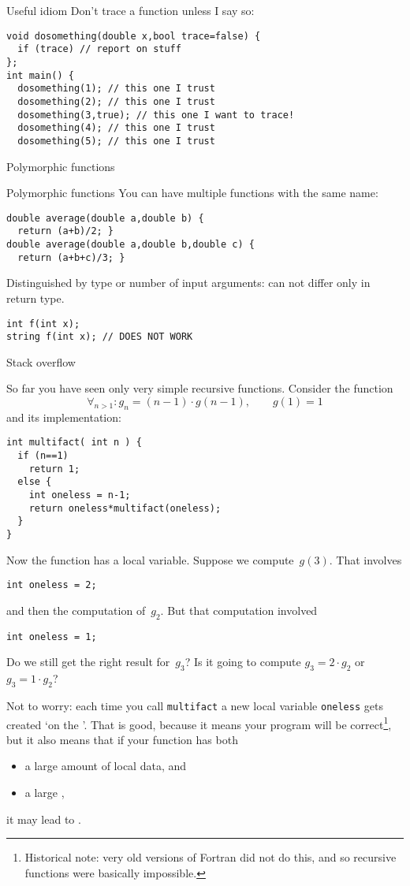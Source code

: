 \begin{block}{Useful idiom}
  \label{sl:poly-trace}
  Don't trace a function unless I say so:
\begin{lstlisting}
void dosomething(double x,bool trace=false) {
  if (trace) // report on stuff
};
int main() {
  dosomething(1); // this one I trust
  dosomething(2); // this one I trust
  dosomething(3,true); // this one I want to trace!
  dosomething(4); // this one I trust
  dosomething(5); // this one I trust
\end{lstlisting}
\end{block}

 {Polymorphic functions}
\label{sec:polyfunc}

\begin{block}{Polymorphic functions}
  \label{sl:func-poly}
  You can have multiple functions with the same name:
\begin{lstlisting}
double average(double a,double b) {
  return (a+b)/2; }
double average(double a,double b,double c) {
  return (a+b+c)/3; }
\end{lstlisting}
Distinguished by type or number of input arguments:
can not differ only in return type.
\begin{lstlisting}
int f(int x);
string f(int x); // DOES NOT WORK
\end{lstlisting}
\end{block}

 {Stack overflow}

So far you have seen only very simple recursive functions. Consider
the function
\[ \forall_{n>1}\colon g_n = (n-1)\cdot g(n-1),\qquad g(1)=1 \]
and its implementation:
\begin{lstlisting}
int multifact( int n ) {
  if (n==1)
    return 1;
  else {
    int oneless = n-1;
    return oneless*multifact(oneless);
  }
}
\end{lstlisting}
Now the function has a local variable. Suppose we compute~$g(3)$. That
involves
\begin{lstlisting}
int oneless = 2;
\end{lstlisting}
and then the computation of~$g_2$. But that computation involved 
\begin{lstlisting}
int oneless = 1;
\end{lstlisting}
Do we still get the right result for~$g_3$? Is it going to compute
$g_3=2\cdot g_2$ or $g_3=1\cdot g_2$?

Not to worry: each time you call \lstinline{multifact} a new local variable
\lstinline{oneless} gets created `on the '. That is good, because it means your program
will be correct\footnote{Historical note: very old versions of Fortran
  did not do this, and so recursive functions were basically
  impossible.}, but it also means that if your function has both
\begin{itemize}
\item a large amount of local data, and
\item a large ,
\end{itemize}
it may lead to .

